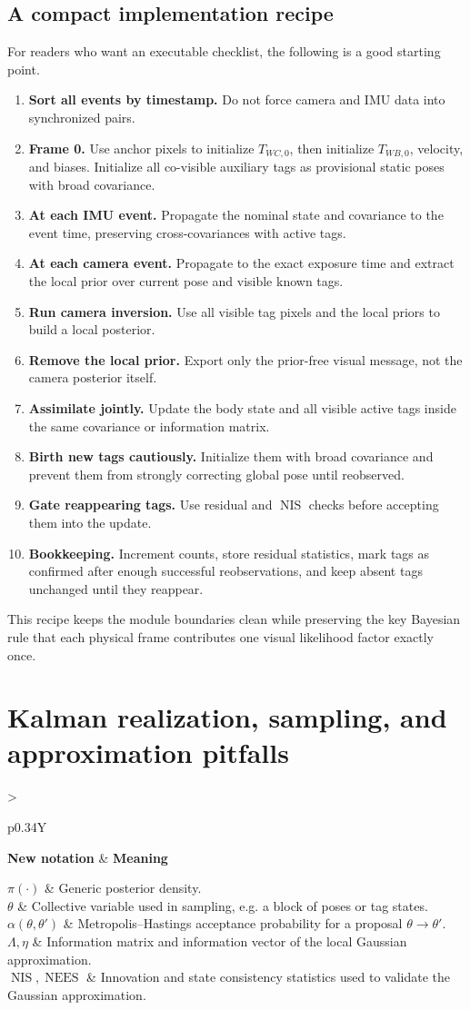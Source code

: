 \documentclass[11pt]{report}
\newcommand{\NIS}{\operatorname{NIS}}
\newcommand{\NEES}{\operatorname{NEES}}
\newcommand{\NotationTable}[1]{%
\vspace{0.6mm}
{\scriptsize
\setlength{\tabcolsep}{2.5pt}
\begin{tabularx}{\columnwidth}{>{\raggedright\arraybackslash}p{0.34\columnwidth}Y}
\toprule
\textbf{New notation} & \textbf{Meaning}\\
\midrule
#1\\
\bottomrule
\end{tabularx}}
\vspace{0.8mm}}
\begin{document}
\subsection{A compact implementation recipe}
For readers who want an executable checklist, the following is a good starting point.
\begin{enumerate}
    \item \textbf{Sort all events by timestamp.} Do not force camera and IMU data into synchronized pairs.
    \item \textbf{Frame 0.} Use anchor pixels to initialize $T_{WC,0}$, then initialize $T_{WB,0}$, velocity, and biases. Initialize all co-visible auxiliary tags as provisional static poses with broad covariance.
    \item \textbf{At each IMU event.} Propagate the nominal state and covariance to the event time, preserving cross-covariances with active tags.
    \item \textbf{At each camera event.} Propagate to the exact exposure time and extract the local prior over current pose and visible known tags.
    \item \textbf{Run camera inversion.} Use all visible tag pixels and the local priors to build a local posterior.
    \item \textbf{Remove the local prior.} Export only the prior-free visual message, not the camera posterior itself.
    \item \textbf{Assimilate jointly.} Update the body state and all visible active tags inside the same covariance or information matrix.
    \item \textbf{Birth new tags cautiously.} Initialize them with broad covariance and prevent them from strongly correcting global pose until reobserved.
    \item \textbf{Gate reappearing tags.} Use residual and $\NIS$ checks before accepting them into the update.
    \item \textbf{Bookkeeping.} Increment counts, store residual statistics, mark tags as confirmed after enough successful reobservations, and keep absent tags unchanged until they reappear.
\end{enumerate}
This recipe keeps the module boundaries clean while preserving the key Bayesian rule that each physical frame contributes one visual likelihood factor exactly once.

\section{Kalman realization, sampling, and approximation pitfalls}
\NotationTable{
$\pi(\cdot)$ & Generic posterior density.\\
$\theta$ & Collective variable used in sampling, e.g. a block of poses or tag states.\\
$\alpha(\theta,\theta')$ & Metropolis--Hastings acceptance probability for a proposal $\theta\to\theta'$.\\
$\Lambda,\eta$ & Information matrix and information vector of the local Gaussian approximation.\\
$\NIS,\NEES$ & Innovation and state consistency statistics used to validate the Gaussian approximation.}
\end{document}
